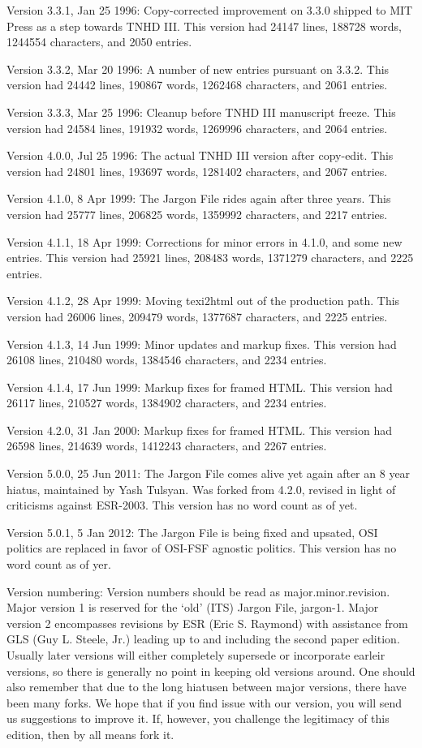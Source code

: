 Version 3.3.1, Jan 25 1996: Copy-corrected improvement on 3.3.0 shipped to MIT Press as a step towards TNHD III. This version had 24147
lines, 188728 words, 1244554 characters, and 2050 entries.

Version 3.3.2, Mar 20 1996: A number of new entries pursuant on 3.3.2. This version had 24442 lines, 190867 words, 1262468 characters, and
2061 entries.

Version 3.3.3, Mar 25 1996: Cleanup before TNHD III manuscript freeze. This version had 24584 lines, 191932 words, 1269996 characters, and
2064 entries.

Version 4.0.0, Jul 25 1996: The actual TNHD III version after copy-edit. This version had 24801 lines, 193697 words, 1281402 characters,
and 2067 entries.

Version 4.1.0, 8 Apr 1999: The Jargon File rides again after three years. This version had 25777 lines, 206825 words, 1359992 characters,
and 2217 entries.

Version 4.1.1, 18 Apr 1999: Corrections for minor errors in 4.1.0, and some new entries. This version had 25921 lines, 208483 words,
1371279 characters, and 2225 entries.

Version 4.1.2, 28 Apr 1999: Moving texi2html out of the production path. This version had 26006 lines, 209479 words, 1377687 characters,
and 2225 entries.

Version 4.1.3, 14 Jun 1999: Minor updates and markup fixes. This version had 26108 lines, 210480 words, 1384546 characters, and 2234
entries.

Version 4.1.4, 17 Jun 1999: Markup fixes for framed HTML. This version had 26117 lines, 210527 words, 1384902 characters, and 2234 entries.

Version 4.2.0, 31 Jan 2000: Markup fixes for framed HTML. This version had 26598 lines, 214639 words, 1412243 characters, and 2267 entries.

Version 5.0.0, 25 Jun 2011: The Jargon File comes alive yet again after an 8 year hiatus, maintained by Yash Tulsyan. Was forked from
4.2.0, revised in light of criticisms against ESR-2003. This version has no word count as of yet.

Version 5.0.1, 5 Jan 2012: The Jargon File is being fixed and upsated, OSI politics are replaced in favor of OSI-FSF agnostic politics.
This version has no word count as of yer.

Version numbering: Version numbers should be read as major.minor.revision. Major version 1 is reserved for the `old' (ITS) Jargon File,
jargon-1. Major version 2 encompasses revisions by ESR (Eric S. Raymond) with assistance from GLS (Guy L. Steele, Jr.) leading up to and
including the second paper edition. Usually later versions will either completely supersede or incorporate earleir versions, so there is
generally no point in keeping old versions around. One should also remember that due to the long hiatusen between major versions, there
have been many forks. We hope that if you find issue with our version, you will send us suggestions to improve it. If, however, you
challenge the legitimacy of this edition, then by all means fork it.

